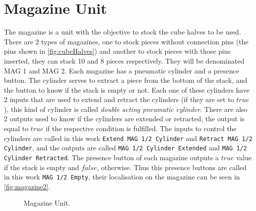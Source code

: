 \section{Magazine Unit}
\label{sec:magazine}
The magazine is a unit with the objective to stock the cube halves to be used.
There are 2 types of magazines, one to stock pieces without connection pins (the pins shown in \autoref{fig:cubeHalves}) and another to
 stock pieces with those pins inserted, they can stack 10 and 8 pieces
 respectively. They will be denominated MAG 1 and MAG 2.
Each magazine has a pneumatic cylinder and a presence button. The cylinder serves to extract a
piece from the bottom of the stack, and the button to know if the stack is empty
or not. Each one of these cylinders have 2 inputs that are used to extend and retract the cylinders (if they
are set to $true$), this kind of cylinder is called \emph{double acting
  pneumatic cylinder}. There are also 2
outputs  used to know if the cylinders are extended or retracted, the output
is equal to $true$ if the respective condition is fulfilled. The inputs to
control the cylinders are called in this work \verb|Extend MAG 1/2 Cylinder| and
\verb|Retract MAG 1/2 Cylinder|, and the outputs are called \verb|MAG 1/2 Cylinder Extended| and
\verb|MAG 1/2 Cylinder Retracted|. The presence button of each magazine outputs a $true$
value if the stack is empty and $false$, otherwise. Thus this presence buttons
are called in this work \verb|MAG 1/2 Empty|, their localisation on the magazine
can be seen in \autoref{fig:magazine2}. 
\begin{figure}[H]
  \centering
  \caption{Magazine Unit.}
  \label{fig:magazine2}
\end{figure}

